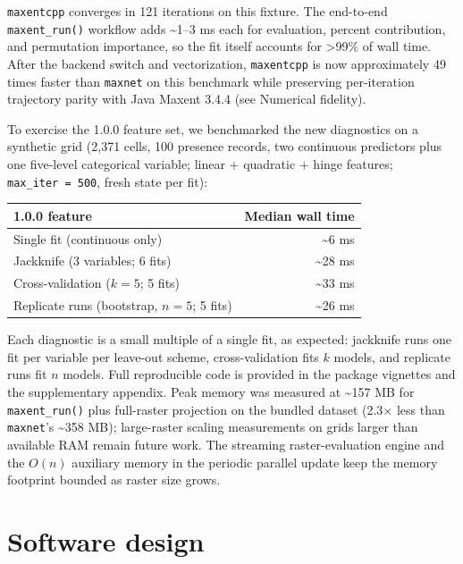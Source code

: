 \documentclass[10pt,letterpaper]{article}
\newcounter{none} %
\begin{document}
\texttt{maxentcpp} converges in 121 iterations on this fixture. The
end-to-end \texttt{maxent\_run()} workflow adds \textasciitilde1--3 ms
each for evaluation, percent contribution, and permutation importance,
so the fit itself accounts for \textgreater99\% of wall time. After the
backend switch and vectorization, \texttt{maxentcpp} is now approximately
49 times faster than \texttt{maxnet} on this benchmark while preserving
per-iteration trajectory parity with Java Maxent 3.4.4 (see Numerical
fidelity).

To exercise the 1.0.0 feature set, we benchmarked the new diagnostics on
a synthetic grid (2,371 cells, 100 presence records, two continuous
predictors plus one five-level categorical variable; linear + quadratic
+ hinge features; \texttt{max\_iter\ =\ 500}, fresh state per fit):

{\def\LTcaptype{none} %
\begin{longtable}[]{@{}lr@{}}
\toprule\noalign{}
1.0.0 feature & Median wall time \\
\midrule\noalign{}
\endhead
\bottomrule\noalign{}
\endlastfoot
Single fit (continuous only) & \textasciitilde6 ms \\
Jackknife (3 variables; 6 fits) & \textasciitilde28 ms \\
Cross-validation (\(k = 5\); 5 fits) & \textasciitilde33 ms \\
Replicate runs (bootstrap, \(n = 5\); 5 fits) & \textasciitilde26 ms \\
\end{longtable}
}

Each diagnostic is a small multiple of a single fit, as expected:
jackknife runs one fit per variable per leave-out scheme,
cross-validation fits \(k\) models, and replicate runs fit \(n\) models.
Full reproducible code is provided in the package vignettes and the
supplementary appendix. Peak memory was measured at \textasciitilde157
MB for \texttt{maxent\_run()} plus full-raster projection on the bundled
dataset (2.3$\times$ less than \texttt{maxnet}'s \textasciitilde358 MB);
large-raster scaling measurements on grids larger than available RAM
remain future work. The streaming raster-evaluation engine and the
\(O(n)\) auxiliary memory in the periodic parallel update keep the
memory footprint bounded as raster size grows.

\section*{Software design}
\end{document}
